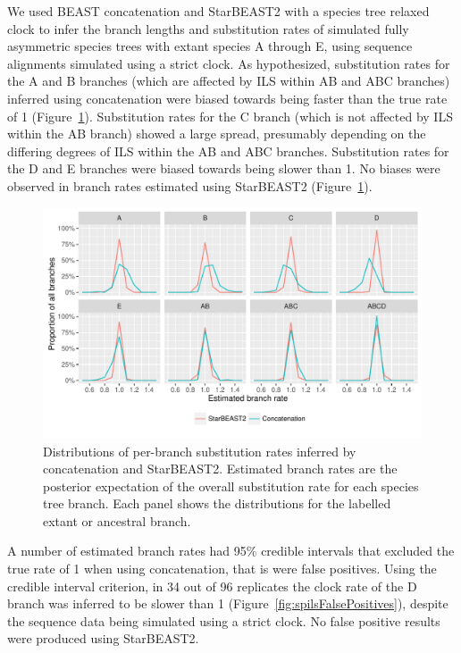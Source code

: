 \documentclass[nogrid]{MBE}%
\begin{document}
We used BEAST concatenation and StarBEAST2 with a species tree relaxed clock to
infer the branch lengths and substitution rates of simulated fully asymmetric species
trees with extant species A through E, using sequence alignments simulated using
a strict clock. As hypothesized, substitution rates for the A and B branches
(which are affected by ILS within AB and ABC branches) inferred using
concatenation were biased towards being faster than the true rate of 1
(Figure~\ref{fig:spilsRates}). Substitution rates for the C branch (which is not
affected by ILS within the AB branch) showed a large spread, presumably
depending on the differing degrees of ILS within the AB and ABC branches.
Substitution rates for the D and E branches were biased towards being slower
than 1. No biases were observed in branch rates estimated using StarBEAST2
(Figure~\ref{fig:spilsRates}).

\begin{figure}[htb!]
\centering
\includegraphics[width=\textwidth]{spils.pdf}
\caption
{Distributions of per-branch substitution rates inferred by concatenation and StarBEAST2. Estimated branch
rates are the posterior expectation of the overall substitution rate for each
species tree branch. Each panel shows the distributions for the labelled extant or
ancestral branch.}
\label{fig:spilsRates}
\end{figure}

A number of estimated branch rates had 95\% credible intervals that excluded the
true rate of 1 when using concatenation, that is were false positives. Using the
credible interval criterion, in 34 out of 96 replicates the clock rate of the D
branch was inferred to be slower than 1 (Figure~\ref{fig:spilsFalsePositives}),
despite the sequence data being simulated using a strict clock. No false
positive results were produced using StarBEAST2.
\end{document}
